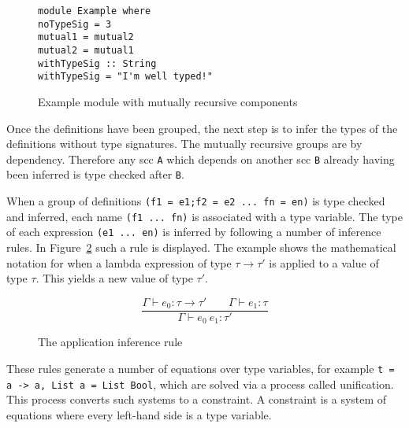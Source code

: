 \begin{figure}[!htb]
\centering
\begin{minipage}[b]{0.55\linewidth}
\centering
\begin{lstlisting}
module Example where
noTypeSig = 3
mutual1 = mutual2
mutual2 = mutual1
withTypeSig :: String
withTypeSig = "I'm well typed!"
\end{lstlisting}
\end{minipage}
\caption{Example module with mutually recursive components}
\label{lst:tc_impl}
\end{figure}

Once the definitions have been grouped, the next step is to infer the types of the definitions without type signatures. The mutually recursive groups are  by dependency. Therefore any \gls{scc} \texttt{A} which depends on another \gls{scc} \texttt{B} already having been inferred is type checked after \texttt{B}. 

When a group of definitions \texttt{(f1 = e1;f2 = e2 ... fn = en)} is type checked and inferred, each name \texttt{(f1 ... fn)} is associated with a type variable. The type of each expression \texttt{(e1 ... en)} is inferred by following a number of inference rules. In Figure~\ref{eq:app} such a rule is displayed. The example shows the mathematical notation for when a lambda expression of type \texttt{$\tau \rightarrow \tau'$} is applied to a value of type \texttt{$\tau$}. This yields a new value of type \texttt{$\tau'$}.

\begin{figure}[!h]
\[
 \displaystyle\frac{\Gamma \vdash e_0:\tau \rightarrow \tau' \quad\quad \Gamma \vdash e_1 : \tau }{\Gamma \vdash e_0\ e_1 : \tau'}
\]
\caption{The application inference rule}
\label{eq:app}
\end{figure}

These rules generate a number of equations over type variables, for example \texttt{t = a -> a, List a = List Bool}, which are solved via a process called \gls{unification}. This process converts such systems to a \gls{constraint}. A constraint is a system of equations where every left-hand side is a type variable. 

